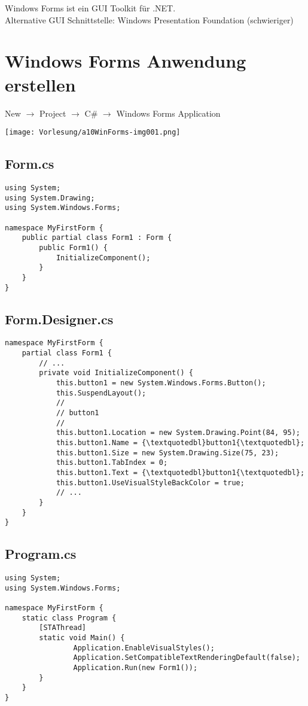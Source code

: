 Windows Forms ist ein GUI Toolkit für .NET.\\
Alternative GUI Schnittstelle: Windows Presentation Foundation (schwieriger)

\section{Windows Forms Anwendung erstellen}

New $\to$ Project $\to$ C\# $\to$ Windows Forms Application
\begin{center}
\texttt{[image: Vorlesung/a10WinForms-img001.png]} 
\end{center}

\subsection{Form.cs}
\begin{lstlisting}[language={[Sharp]C}]
using System;
using System.Drawing;
using System.Windows.Forms;

namespace MyFirstForm {
	public partial class Form1 : Form {
		public Form1() {
			InitializeComponent();
		}
	}
}
\end{lstlisting}

\subsection{Form.Designer.cs}
\begin{lstlisting}[language={[Sharp]C}]
namespace MyFirstForm {
	partial class Form1 {
		// ...
		private void InitializeComponent() {
			this.button1 = new System.Windows.Forms.Button();
			this.SuspendLayout();
			// 
			// button1
			// 
			this.button1.Location = new System.Drawing.Point(84, 95);
			this.button1.Name = {\textquotedbl}button1{\textquotedbl};
			this.button1.Size = new System.Drawing.Size(75, 23);
			this.button1.TabIndex = 0;
			this.button1.Text = {\textquotedbl}button1{\textquotedbl};
			this.button1.UseVisualStyleBackColor = true;
			// ...
		}
	}
}
\end{lstlisting}

\subsection{Program.cs}
\begin{lstlisting}[language={[Sharp]C}]
using System;
using System.Windows.Forms;

namespace MyFirstForm {
	static class Program {
		[STAThread]
		static void Main() {
				Application.EnableVisualStyles();
				Application.SetCompatibleTextRenderingDefault(false);
				Application.Run(new Form1());
		}
	}
}
\end{lstlisting}

